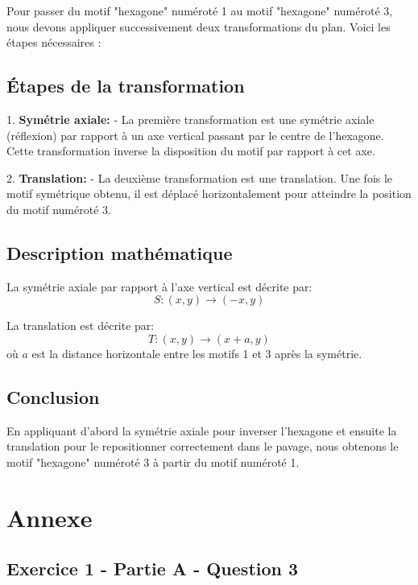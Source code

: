 \documentclass[answers]{exam}
\begin{document}
\begin{solution}
Pour passer du motif "hexagone" numéroté 1 au motif "hexagone" numéroté 3, nous devons appliquer successivement deux transformations du plan. Voici les étapes nécessaires :

\subsection*{Étapes de la transformation}

1. \textbf{Symétrie axiale:} 
   - La première transformation est une symétrie axiale (réflexion) par rapport à un axe vertical passant par le centre de l'hexagone. Cette transformation inverse la disposition du motif par rapport à cet axe.

2. \textbf{Translation:}
   - La deuxième transformation est une translation. Une fois le motif symétrique obtenu, il est déplacé horizontalement pour atteindre la position du motif numéroté 3.

\subsection*{Description mathématique}

\begin{compactitem}
    \item La symétrie axiale par rapport à l'axe vertical est décrite par:
    \[
    S: (x, y) \rightarrow (-x, y)
    \]
    \item La translation est décrite par:
    \[
    T: (x, y) \rightarrow (x + a, y)
    \]
    où \(a\) est la distance horizontale entre les motifs 1 et 3 après la symétrie.
\end{compactitem}

\subsection*{Conclusion}

En appliquant d'abord la symétrie axiale pour inverser l'hexagone et ensuite la translation pour le repositionner correctement dans le pavage, nous obtenons le motif "hexagone" numéroté 3 à partir du motif numéroté 1.
\end{solution}

\section*{Annexe}

\subsection*{Exercice 1 - Partie A - Question 3}
\end{document}
